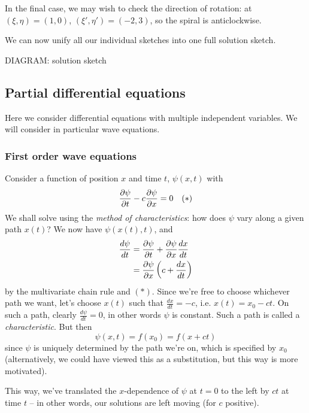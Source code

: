 \documentclass{../template/note}
\begin{document}
\begin{example}
\begin{center}
            
        \end{center}
        In the final case, we may wish to check the direction of rotation: at \((\xi, \eta) = (1, 0)\), \((\xi', \eta') = (-2, 3)\), so the spiral is anticlockwise.

        We can now unify all our individual sketches into one full solution sketch.

        DIAGRAM: solution sketch
    \end{example}
    
    \subsection{Partial differential equations}

    Here we consider differential equations with multiple independent variables. We will consider in particular wave equations.
    
    \subsubsection{First order wave equations}
    
    Consider a function of position \(x\) and time \(t\), \(\psi(x, t)\) with
    \begin{align*}
        \pd \psi t - c \pd \psi x = 0 && (*)
    \end{align*}
    We shall solve using the \emph{method of characteristics}: how does \(\psi\) vary along a given path \(x(t)\)? We now have \(\psi(x(t), t)\), and
    \begin{align*}
        \frac{d\psi}{dt} &= \pd \psi t + \pd \psi x \frac{dx}{dt} \\
        &= \pd \psi x \left(c + \frac{dx}{dt}\right)
    \end{align*}
    by the multivariate chain rule and \((*)\). Since we're free to choose whichever path we want, let's choose \(x(t)\) such that \(\frac{dx}{dt} = -c\), i.e. \(x(t) = x_0 - ct\). On such a path, clearly \(\frac{d\psi}{dt} = 0\), in other words \(\psi\) is constant. Such a path is called a \emph{characteristic}. But then
    \[
        \psi(x, t) = f(x_0) = f(x + ct)
    \]
    since \(\psi\) is uniquely determined by the path we're on, which is specified by \(x_0\) (alternatively, we could have viewed this as a substitution, but this way is more motivated).


    This way, we've translated the \(x\)-dependence of \(\psi\) at \(t=0\) to the left by \(ct\) at time \(t\) -- in other words, our solutions are left moving (for \(c\) positive).
\end{document}
